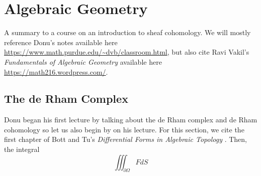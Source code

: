 \chapter{Algebraic Geometry}
A summary to a course on an introduction to sheaf cohomology. We will
mostly reference Donu's notes available here
\url{https://www.math.purdue.edu/~dvb/classroom.html}, but also cite Ravi
Vakil's \emph{Fundamentals of Algebraic Geometry} \cite{vakil} available
here \url{https://math216.wordpress.com/}.

\section{The de Rham Complex}
Donu began his first lecture by talking about the de Rham complex and de
Rham cohomology so let us also begin by on his lecture. For this section,
we cite the first chapter of Bott and Tu's \emph{Differential Forms in
  Algebraic Topology} \cite{bott-tu}. Then, the integral
\[
  \iiint_{\partial\Omega} Fd S
\]


